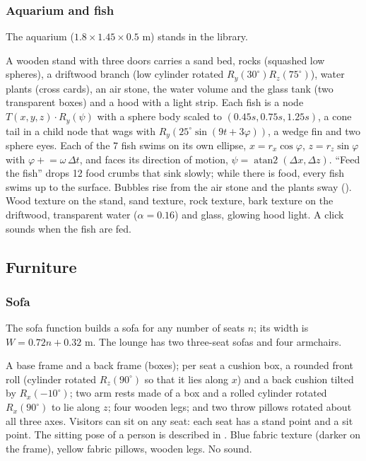 \subsubsection{Aquarium and fish}
The aquarium ($1.8\times1.45\times0.5$ m) stands in the library.

 A wooden stand with three doors carries a sand bed, rocks (squashed low spheres), a
driftwood branch (low cylinder rotated $R_y(30^\circ)R_z(75^\circ)$), water plants (cross cards), an air stone,
the water volume and the glass tank (two transparent boxes) and a hood with a light strip. Each fish is a node
$T(x,y,z)\cdot R_y(\psi)$ with a sphere body scaled to $(0.45s,0.75s,1.25s)$, a cone tail in a child node that
wags with $R_y(25^\circ\sin(9t+3\varphi))$, a wedge fin and two sphere eyes.
 Each of the 7 fish swims on its own ellipse, $x=r_x\cos\varphi$, $z=r_z\sin\varphi$ with
$\varphi \mathrel{+}= \omega\,\Delta t$, and faces its direction of motion, $\psi=\operatorname{atan2}(\Delta x,\Delta z)$.
``Feed the fish'' drops 12 food crumbs that sink slowly; while there is food, every fish swims up to the
surface. Bubbles rise from the air stone and the plants sway ().
 Wood texture on the stand, sand texture, rock texture, bark texture on
the driftwood, transparent water ($\alpha=0.16$) and glass, glowing hood light. A click sounds when the fish
are fed.

\subsection{Furniture}
\subsubsection{Sofa}
The sofa function builds a sofa for any number of seats $n$; its width is $W = 0.72n + 0.32$ m. The lounge
has two three-seat sofas and four armchairs.

 A base frame and a back frame (boxes); per seat a cushion box, a rounded front roll
(cylinder rotated $R_z(90^\circ)$ so that it lies along $x$) and a back cushion tilted by $R_x(-10^\circ)$; two
arm rests made of a box and a rolled cylinder rotated $R_x(90^\circ)$ to lie along $z$; four wooden legs; and
two throw pillows rotated about all three axes.
 Visitors can sit on any seat: each seat has a stand point and a sit point. The sitting
pose of a person is described in .
 Blue fabric texture (darker on the frame), yellow fabric pillows, wooden
legs. No sound.

